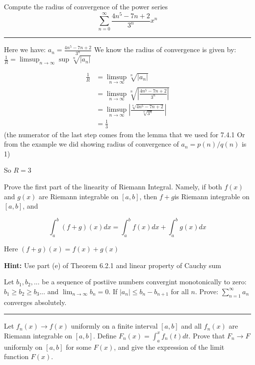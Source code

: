 \documentclass[11pt]{article}
\begin{document}

Compute the radius of convergence of the power series 
$$\sum_{n=0} ^ \infty \frac{4n^5 - 7n + 2}{3^n} x^n$$

\hrule

Here we have: $a_n = \frac{4n^5 - 7n + 2}{3^n}$
We know the radius of convergence is given by: 
$\frac{1}{R} = \limsup_{n \to \infty} \sup \sqrt[n]{|a_n|}$

\begin{align*}
    \frac{1}{R} &= \limsup_{n \to \infty} \sqrt[n]{|a_n|}\\
    &= \limsup_{n \to \infty} \sqrt[n]{\left|\frac{4n^5 - 7n + 2}{3^n}\right|}\\
    &= \limsup_{n \to \infty} \left|\frac{\sqrt[n]{4n^5 - 7n + 2}}{\sqrt[n]{3^n}}\right|\\
    &= \frac{1}{3}
\end{align*}
(the numerator of the last step comes from the lemma that we used for 7.4.1
Or from the example we did showing radius of convergence of $a_n = p(n)/q(n)$ is 1)

So $R = 3$





Prove the first part of the linearity of Riemann Integral. 
Namely, if both $f(x)$ and $g(x)$ are Riemann integrable on $[a,b]$, 
then $f+g$is Riemann integrable on $[a,b]$, and 

$$\int_a ^b (f + g)(x)dx = \int_a ^b f(x) dx + \int_a ^b g(x) dx$$

Here $(f + g)(x) = f(x) + g(x)$

\textbf{Hint:} Use part (e) of Theorem 6.2.1 and linear property of Cauchy sum












Let $b_1, b_2, ...$ be a sequence of postiive numbers convergint monotonically to zero:
$b_1 \geq b_2 \geq b_3 ...$ and $\lim_{n \to \infty} b_n = 0$.
If $|a_n| \leq b_n - b_{n+1}$ for all $n$. Prove:
$\sum_{n=1}^\infty a_n$ converges absolutely.

\hrule








Let $f_n(x) \to f(x)$ uniformly on a finite interval $[a,b]$ and all $f_n(x)$
are Riemann integrable on $[a,b]$. Define $F_n (x) = \int_a ^x f_n(t)dt$.
Prove that $F_n \to F$ uniformly on $[a,b]$ for some $F(x)$, 
and give the expression of the limit function $F(x)$.
\end{document}
